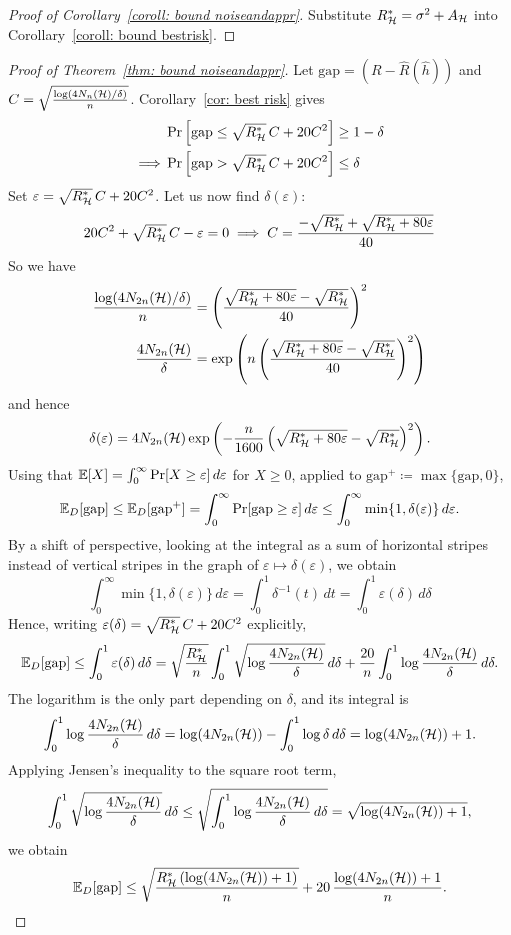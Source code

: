 \documentclass[reqno]{amsart}
\begin{document}
\begin{proof}[Proof of Corollary~\ref{coroll: bound noiseandappr}]
  Substitute $R^*_{\mathcal{H}} = \sigma^2 + A_{\mathcal{H}}$ into Corollary~\ref{coroll: bound bestrisk}.
\end{proof}

\begin{proof}[Proof of Theorem~\ref{thm: bound noiseandappr}]
    Let $\text{gap} = (R-\hat R(\hat h))$ and $C = \sqrt{\frac{\log(4 N_n(\mathcal{H})/\delta)}{n}}$. Corollary~\ref{cor: best risk} gives
\begin{align*}
&\Pr\left[\text{gap} \le \sqrt{R^*_{\mathcal{H}}}\,C + 20C^2\right] \ge 1-\delta \\
\implies &\Pr\left[\text{gap} > \sqrt{R^*_{\mathcal{H}}}\,C + 20C^2\right] \le \delta
\end{align*}
Set $\varepsilon = \sqrt{R^*_{\mathcal{H}}}\,C + 20C^2$. Let us now find $\delta(\varepsilon)$:
\[
20C^2 + \sqrt{R^*_{\mathcal{H}}}\,C - \varepsilon = 0 \implies C = \frac{-\sqrt{R^*_{\mathcal{H}}} + \sqrt{R^*_{\mathcal{H}} + 80\varepsilon}}{40}
\]
So we have
\begin{align*}
\frac{\log(4N_{2n}(\mathcal{H})/\delta)}{n} &= \left(\frac{\sqrt{R^*_{\mathcal{H}} + 80\varepsilon} - \sqrt{R^*_{\mathcal{H}}}}{40}\right)^2 \\
\frac{4N_{2n}(\mathcal{H})}{\delta} &= \exp\left(n\left(\frac{\sqrt{R^*_{\mathcal{H}} + 80\varepsilon} - \sqrt{R^*_{\mathcal{H}}}}{40}\right)^2\right)
\end{align*}
and hence
\[
\delta(\varepsilon) = 4N_{2n}(\mathcal{H})\exp\left(-\frac{n}{1600}\left(\sqrt{R^*_{\mathcal{H}} + 80\varepsilon} - \sqrt{R^*_{\mathcal{H}}}\right)^2\right).
\]
Using that $\mathbb{E}[X] = \int_0^\infty \Pr[X \ge \varepsilon]\,d\varepsilon$ for $X \ge 0$, applied to $\text{gap}^+ \coloneq \max\{\text{gap}, 0\}$,
\[
\mathbb{E}_D[\text{gap}] \le \mathbb{E}_D[\text{gap}^+] = \int_0^\infty \Pr[\text{gap} \ge \varepsilon]\,d\varepsilon \le \int_0^\infty \min\{1, \delta(\varepsilon)\}\,d\varepsilon.
\]
By a shift of perspective, looking at the integral as a sum of horizontal stripes instead of vertical stripes in the graph of $\varepsilon \mapsto \delta(\varepsilon)$, we obtain
\[
\int_0^\infty \min\{1, \delta(\varepsilon)\}\,d\varepsilon = \int_0^1 \delta^{-1}(t)\,dt = \int_0^1 \varepsilon(\delta)\,d\delta
\]
Hence, writing $\varepsilon(\delta) = \sqrt{R^*_{\mathcal{H}}}\,C + 20C^2$ explicitly,
\[
\mathbb{E}_D[\text{gap}] \le \int_0^1 \varepsilon(\delta)\,d\delta = \sqrt{\frac{R^*_{\mathcal{H}}}{n}}\int_0^1 \sqrt{\log\frac{4N_{2n}(\mathcal{H})}{\delta}}\,d\delta + \frac{20}{n}\int_0^1 \log\frac{4N_{2n}(\mathcal{H})}{\delta}\,d\delta.
\]
The logarithm is the only part depending on $\delta$, and its integral is
\[
\int_0^1 \log\frac{4N_{2n}(\mathcal{H})}{\delta}\,d\delta = \log(4N_{2n}(\mathcal{H})) - \int_0^1 \log\delta\,d\delta = \log(4N_{2n}(\mathcal{H})) + 1.
\]
Applying Jensen's inequality to the square root term,
\[
\int_0^1 \sqrt{\log\frac{4N_{2n}(\mathcal{H})}{\delta}}\,d\delta \le \sqrt{\int_0^1 \log\frac{4N_{2n}(\mathcal{H})}{\delta}\,d\delta} = \sqrt{\log(4N_{2n}(\mathcal{H})) + 1},
\]
we obtain
\[
\mathbb{E}_D[\text{gap}] \le \sqrt{\frac{R^*_{\mathcal{H}}\left(\log(4N_{2n}(\mathcal{H})) + 1\right)}{n}} + 20\,\frac{\log(4N_{2n}(\mathcal{H})) + 1}{n}.
\]


\end{proof}
\end{document}
